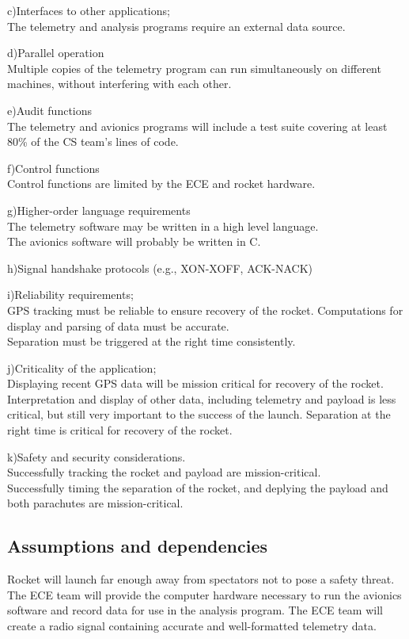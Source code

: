 \documentclass[onecolumn, draftclsnofoot, 10pt, compsoc]{IEEEtran}
\begin{document}
c)Interfaces to other applications;\\
The telemetry and analysis programs require an external data source.

d)Parallel operation\\
Multiple copies of the telemetry program can run simultaneously on different machines, without interfering with each other.

e)Audit functions\\
The telemetry and avionics programs will include a test suite covering at least 80\% of the CS team’s lines of code.

f)Control functions\\
Control functions are limited by the ECE and rocket hardware.

g)Higher-order language requirements\\
The telemetry software may be written in a high level language.\\
The avionics software will probably be written in C.

h)Signal handshake protocols (e.g., XON-XOFF, ACK-NACK)

i)Reliability requirements;\\
GPS tracking must be reliable to ensure recovery of the rocket. Computations for display and parsing of data must be accurate.\\
Separation must be triggered at the right time consistently.

j)Criticality of the application;\\
Displaying recent GPS data will be mission critical for recovery of the rocket. Interpretation and display of other data, including telemetry and payload is less critical, but still very important to the success of the launch. Separation at the right time is critical for recovery of the rocket.

k)Safety and security considerations.\\
Successfully tracking the rocket and payload are mission-critical.\\
Successfully timing the separation of the rocket, and deplying the payload and both parachutes are mission-critical.

\subsection{Assumptions and dependencies}
Rocket will launch far enough away from spectators not to pose a safety threat.
The ECE team will provide the computer hardware necessary to run the avionics software and record data for use in the analysis program.
The ECE team will create a radio signal containing accurate and well-formatted telemetry data.
\end{document}
